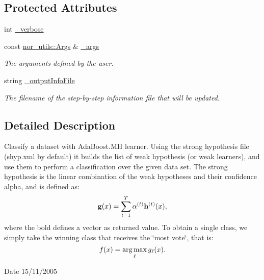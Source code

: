 \subsection*{Protected Attributes}
\begin{DoxyCompactItemize}
\item 
int \hyperlink{classMultiBoost_1_1AdaBoostMHClassifier_a44a57b43a67952352ab59d9967e9e8b9}{\-\_\-verbose}
\item 
\hypertarget{classMultiBoost_1_1AdaBoostMHClassifier_a5a4a553d8952688ae93df619832fbec9}{const \hyperlink{classnor__utils_1_1Args}{nor\-\_\-utils\-::\-Args} \& \hyperlink{classMultiBoost_1_1AdaBoostMHClassifier_a5a4a553d8952688ae93df619832fbec9}{\-\_\-args}}\label{classMultiBoost_1_1AdaBoostMHClassifier_a5a4a553d8952688ae93df619832fbec9}

\begin{DoxyCompactList}\small\item\em The arguments defined by the user. \end{DoxyCompactList}\item 
\hypertarget{classMultiBoost_1_1AdaBoostMHClassifier_a9a149f48a835e2c0c9e9cb814f597642}{string \hyperlink{classMultiBoost_1_1AdaBoostMHClassifier_a9a149f48a835e2c0c9e9cb814f597642}{\-\_\-output\-Info\-File}}\label{classMultiBoost_1_1AdaBoostMHClassifier_a9a149f48a835e2c0c9e9cb814f597642}

\begin{DoxyCompactList}\small\item\em The filename of the step-\/by-\/step information file that will be updated. \end{DoxyCompactList}\end{DoxyCompactItemize}


\subsection{Detailed Description}
Classify a dataset with Ada\-Boost.\-M\-H learner. Using the strong hypothesis file (shyp.\-xml by default) it builds the list of weak hypothesis (or weak learners), and use them to perform a classification over the given data set. The strong hypothesis is the linear combination of the weak hypotheses and their confidence alpha, and is defined as\-: \[ {\bf g}(x) = \sum_{t=1}^T \alpha^{(t)} {\bf h}^{(t)}(x), \] where the bold defines a vector as returned value. To obtain a single class, we simply take the winning class that receives the \char`\"{}most vote\char`\"{}, that is\-: \[ f(x) = \mathop{\rm arg\, max}_{\ell} g_\ell(x). \] \begin{DoxyDate}{Date}
15/11/2005 
\end{DoxyDate}


